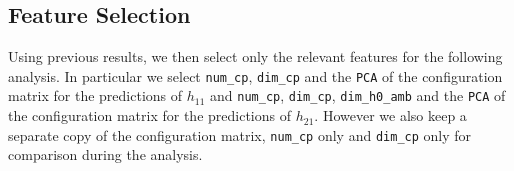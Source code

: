 \subsection{Feature Selection}

    Using previous results, we then select only the relevant features for the following analysis. In particular we select \texttt{num\_cp}, \texttt{dim\_cp} and the \texttt{PCA} of the configuration matrix for the predictions of $h_{11}$ and \texttt{num\_cp}, \texttt{dim\_cp}, \texttt{dim\_h0\_amb} and the \texttt{PCA} of the configuration matrix for the predictions of $h_{21}$. However we also keep a separate copy of the configuration matrix, \texttt{num\_cp} only and \texttt{dim\_cp} only for comparison during the analysis.
